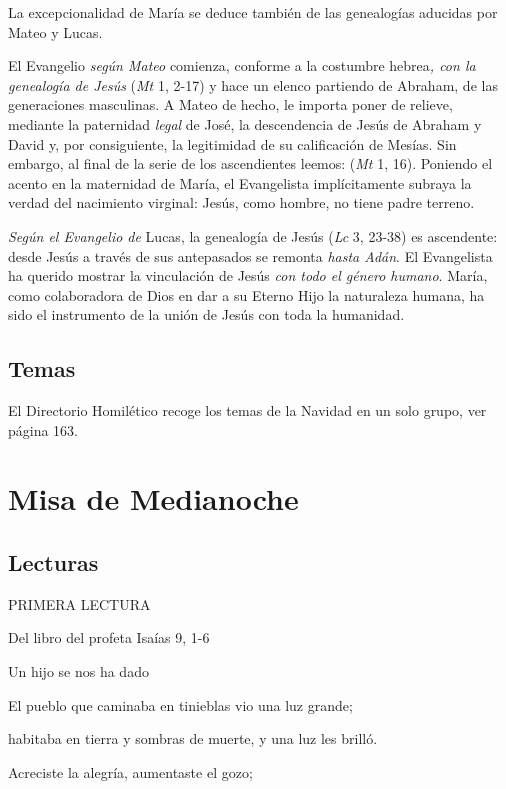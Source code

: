 La excepcionalidad de María se deduce también de las genealogías aducidas por Mateo y Lucas.

El Evangelio \emph{según Mateo} comienza, conforme a la costumbre hebrea\emph{, con la genealogía de Jesús} (\emph{Mt} 1, 2-17) y hace un elenco partiendo de Abraham, de las generaciones masculinas. A Mateo de hecho, le importa poner de relieve, mediante la paternidad \emph{legal} de José, la descendencia de Jesús de Abraham y David y, por consiguiente, la legitimidad de su calificación de Mesías. Sin embargo, al final de la serie de los ascendientes leemos:  (\emph{Mt} 1, 16). Poniendo el acento en la maternidad de María, el Evangelista implícitamente subraya la verdad del nacimiento virginal: Jesús, como hombre, no tiene padre terreno.

\emph{Según el Evangelio de} Lucas, la genealogía de Jesús (\emph{Lc} 3, 23-38) es ascendente: desde Jesús a través de sus antepasados se remonta \emph{hasta Adán}. El Evangelista ha querido mostrar la vinculación de Jesús \emph{con todo el género humano}. María, como colaboradora de Dios en dar a su Eterno Hijo la naturaleza humana, ha sido el instrumento de la unión de Jesús con toda la humanidad.

\section{Temas}

El Directorio Homilético recoge los temas de la Navidad en un solo grupo, ver página 163.

\chapter{Misa de Medianoche}

\section{Lecturas}

PRIMERA LECTURA

Del libro del profeta Isaías 9, 1-6

Un hijo se nos ha dado

El pueblo que caminaba en tinieblas vio una luz grande;

habitaba en tierra y sombras de muerte, y una luz les brilló.

Acreciste la alegría, aumentaste el gozo;

